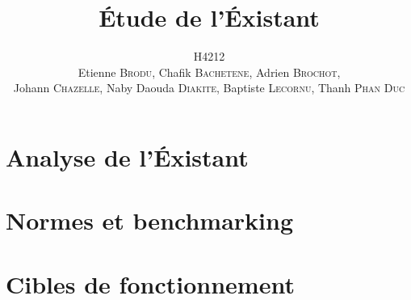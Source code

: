 \documentclass[a4paper,11pt]{report}
\title{\'Etude de l'\'Existant}
\author{H4212\\Etienne \textsc{Brodu}, Chafik \textsc{Bachetene}, Adrien \textsc{Brochot},\\Johann \textsc{Chazelle}, Naby Daouda \textsc{Diakite}, Baptiste \textsc{Lecornu}, Thanh \textsc{Phan Duc}}
\begin{document}
\maketitle
\newpage

\tableofcontents
\newpage

\part{Analyse de l'\'Existant}
    

\part{Normes et benchmarking}
    

\part{Cibles de fonctionnement}
    
\end{document}
